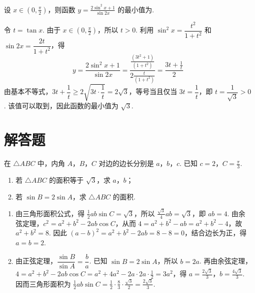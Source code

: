 \begin{problem}
设 \(x \in \left(0, \frac{\pi}{2}\right)\)，则函数 \(y = \frac{2\sin^2 x + 1}{\sin 2x}\) 的最小值为\fillinblank{}.

\begin{solution}
令 \(t=\tan x\). 由于 \(x\in\left(0,\frac{\pi}{2}\right)\)，所以 \(t>0\). 利用
\(\sin^2x=\dfrac{t^2}{1+t^2}\) 和 \(\sin2x=\dfrac{2t}{1+t^2}\)，得
\[
y=\frac{2\sin^2x+1}{\sin2x}
=\frac{\frac{(3t^2+1)}{(1+t^2)}}{2\frac{t}{(1+t^2)}}
=\frac{3t+\frac{1}{t}}{2}
\]
由基本不等式，\(3t+\dfrac{1}{t}\geqslant2\sqrt{3t\cdot\dfrac{1}{t}}=2\sqrt{3}\)，等号当且仅当 \(3t=\dfrac{1}{t}\)，即 \(t=\dfrac{1}{\sqrt{3}}>0\). 该值可以取到，因此函数的最小值为 \(\sqrt{3}\).
\end{solution}
\end{problem}

\section{解答题}

\begin{problem}
在 \(\triangle ABC\) 中，内角 \(A\)，\(B\)，\(C\) 对边的边长分别是 \(a\)，\(b\)，\(c\). 已知 \(c = 2\)，\(C = \frac{\pi}{3}\).

\begin{enumerate}
\item 若 \(\triangle ABC\) 的面积等于 \(\sqrt{3}\)，求 \(a\)，\(b\)；
\item 若 \(\sin B = 2\sin A\)，求 \(\triangle ABC\) 的面积.
\end{enumerate}
\end{problem}

\begin{solution}
\begin{enumerate}
\item 由三角形面积公式，得 \(\frac{1}{2}ab\sin C=\sqrt{3}\)，所以 \(\frac{\sqrt{3}}{4}ab=\sqrt{3}\)，即 \(ab=4\). 由余弦定理，\(c^2=a^2+b^2-2ab\cos C\)，从而 \(4=a^2+b^2-ab=a^2+b^2-4\)，故 \(a^2+b^2=8\). 因此 \((a-b)^2=a^2+b^2-2ab=8-8=0\)，结合边长为正，得 \(a=b=2\).

\item 由正弦定理，\(\dfrac{\sin B}{\sin A}=\dfrac{b}{a}\). 已知 \(\sin B=2\sin A\)，所以 \(b=2a\). 再由余弦定理，\(4=a^2+b^2-2ab\cos C=a^2+4a^2-2a\cdot2a\cdot\frac{1}{2}=3a^2\)，得 \(a=\frac{2\sqrt{3}}{3}\)，\(b=\frac{4\sqrt{3}}{3}\). 因而三角形面积为 \(\frac{1}{2}ab\sin C=\frac{1}{2}\cdot\frac{8}{3}\cdot\frac{\sqrt{3}}{2}=\frac{2\sqrt{3}}{3}\).
\end{enumerate}
\end{solution}

